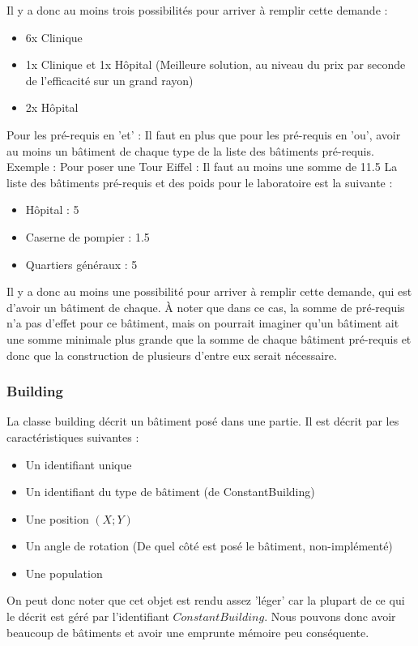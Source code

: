 \documentclass[a4paper,10pt,openany,oneside]{report}
\begin{document}
Il y a donc au moins trois possibilités pour arriver à remplir cette demande :
\begin{itemize}
	\item 6x Clinique
	\item 1x Clinique et 1x Hôpital (Meilleure solution, au niveau du prix par seconde de l'efficacité sur un grand rayon)
	\item 2x Hôpital
\end{itemize}

Pour les pré-requis en 'et' :
Il faut en plus que pour les pré-requis en 'ou', avoir au moins un bâtiment de chaque type de la liste des bâtiments pré-requis.
Exemple :
Pour poser une Tour Eiffel : Il faut au moins une somme de 11.5
La liste des bâtiments pré-requis et des poids pour le laboratoire est la suivante :
\begin{itemize}
	\item Hôpital : 5
	\item Caserne de pompier : 1.5
	\item Quartiers généraux : 5
\end{itemize}
Il y a donc au moins une possibilité pour arriver à remplir cette demande, qui est d'avoir un bâtiment de chaque. À noter que dans ce cas, la somme de pré-requis n'a pas d'effet pour ce bâtiment, mais on pourrait imaginer qu'un bâtiment ait une somme minimale plus grande que la somme de chaque bâtiment pré-requis et donc que la construction de plusieurs d'entre eux serait nécessaire.

\subsubsection{Building}
La classe building décrit un bâtiment posé dans une partie. Il est décrit par les caractéristiques suivantes :
\begin{itemize}
	\item Un identifiant unique
	\item Un identifiant du type de bâtiment (de ConstantBuilding)
	\item Une position $(X;Y)$
	\item Un angle de rotation (De quel côté est posé le bâtiment, non-implémenté)
	\item Une population
\end{itemize}
On peut donc noter que cet objet est rendu assez 'léger' car la plupart de ce qui le décrit est géré par l'identifiant $ConstantBuilding$. Nous pouvons donc avoir beaucoup de bâtiments et avoir une emprunte mémoire peu conséquente.
\end{document}
